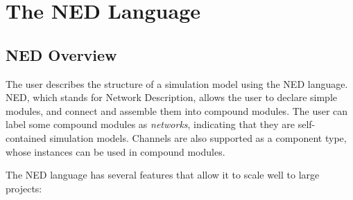 \chapter{The NED Language}
\label{cha:ned-lang}


\section{NED Overview}
\label{sec:ned-lang:ned-overview}

The user describes the structure of a simulation model using the NED language.
NED, which stands for Network Description, allows the user to declare simple
modules, and connect and assemble them into compound modules. The user can label
some compound modules as \textit{networks}, indicating that they are
self-contained simulation models. Channels are also supported as a component
type, whose instances can be used in compound modules.

The NED language has several features that allow it to scale well to large projects:

